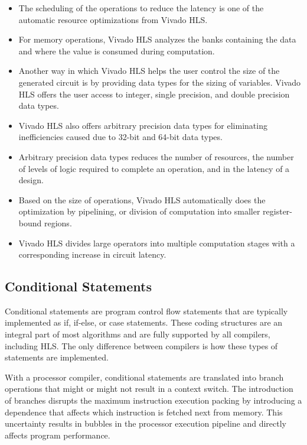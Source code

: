 \begin{itemize}
  \item The scheduling of the operations to reduce the latency is one of the automatic resource optimizations from Vivado HLS.
  \item For memory operations, Vivado HLS analyzes the banks containing the data and where the value is consumed during computation. 
  \item Another way in which Vivado HLS helps the user control the size of the generated circuit is by providing data types for the sizing of variables. Vivado HLS offers the user access to integer, single precision, and double precision data types.
  \item Vivado HLS also offers arbitrary precision data types for eliminating inefficiencies caused due to 32-bit and 64-bit data types.
  \item Arbitrary precision data types reduces the number of resources, the number of levels of logic required to complete an operation, and in the latency of a design.
  \item Based on the size of operations, Vivado HLS automatically does the optimization by pipelining, or division of computation into smaller register-bound regions.
  \item Vivado HLS divides large operators into multiple
  computation stages with a corresponding increase in circuit latency.
\end{itemize}



\subsection{Conditional Statements}
  Conditional statements are program control flow statements that are typically implemented as if, if-else, or case statements. These coding structures are an integral part of most algorithms and are fully supported by all compilers, including HLS. The only difference
  between compilers is how these types of statements are implemented.

  \par With a processor compiler, conditional statements are translated into branch operations that might or might not result in a context switch. The introduction of branches disrupts the maximum instruction execution packing  by introducing a dependence
  that affects which instruction is fetched next from memory. This uncertainty results in bubbles in the processor execution pipeline and directly affects program performance.

